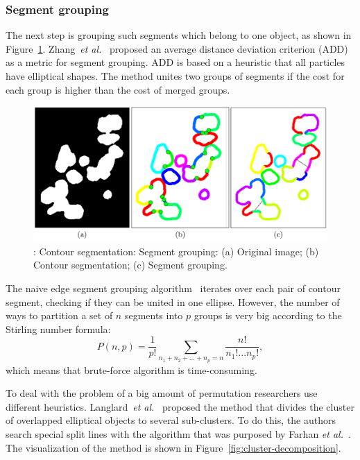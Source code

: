 \documentclass{lutmscthesis}[2010/09/22]
\begin{document}
\subsubsection{Segment grouping}
The next step is grouping such segments which belong to one object, as shown in Figure~\ref{fig:Segment-grouping}. 
Zhang~\emph{et al.}~\cite{bubble} proposed an average distance deviation criterion (ADD) as a metric for segment grouping. ADD is based on a heuristic that all particles have elliptical shapes. The method unites two groups of segments if the cost for each group is higher than the cost of merged groups.
\begin{figure} [ht]
  \includegraphics[width=\linewidth, scale=0.5]{segment-grouping.png}
  \caption{: Contour segmentation: 
    Segment grouping: 
    (a) Original image; 
    (b) Contour segmentation;
    (c) Segment grouping.~\cite{Zafari15}}
  \label{fig:Segment-grouping}
\end{figure}

The naive edge segment grouping algorithm~\cite{bubble} iterates over each pair of contour segment, checking if they can be united in one ellipse. However, the number of ways to partition a set of $n$ segments into $p$ groups is very big according to the Stirling number formula:
    \begin{equation}
        P(n,p) = \frac{1}{p!}\sum_{n_1+n_2+...+n_p=n}\frac{n!}{n_1!...n_p!},
    \end{equation}
which means that brute-force algorithm is time-consuming.

To deal with the problem of a big amount of permutation researchers use different heuristics. Langlard~\emph{et al.}~\cite{LANGLARD2018} proposed the method that divides the cluster of overlapped elliptical objects to several sub-clusters. To do this, the authors search special split lines with the algorithm that was purposed by Farhan \emph{et al.}~\cite{farhan}. The visualization of the method is shown in Figure~\ref{fig:cluster-decomposition}.
\end{document}
